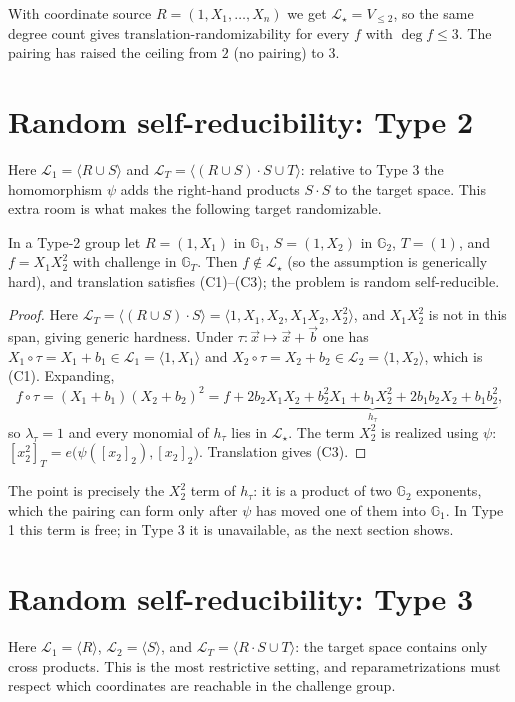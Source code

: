\documentclass{conjura-solution}
\newcommand{\Gone}{\mathbb{G}_1}
\newcommand{\Gtwo}{\mathbb{G}_2}
\newcommand{\GT}{\mathbb{G}_T}
\newcommand{\vx}{\vec{x}}
\newcommand{\vb}{\vec{b}}
\newcommand{\LL}{\mathcal{L}}
\newcommand{\Span}[1]{\langle #1 \rangle} %
\begin{document}
With coordinate source $R=(1,X_1,\dots,X_n)$ we get $\LL_\star=V_{\le 2}$, so the same
degree count gives translation-randomizability for every $f$ with $\deg f\le 3$. The
pairing has raised the ceiling from $2$ (no pairing) to $3$.

\section{Random self-reducibility: Type 2}

Here $\LL_1=\Span{R\cup S}$ and $\LL_T=\Span{(R\cup S)\cdot S\cup T}$: relative to Type 3
the homomorphism $\psi$ adds the right-hand products $S\cdot S$ to the target space. This
extra room is what makes the following target randomizable.

\begin{proposition}
\label{prop:type2}
In a Type-2 group let $R=(1,X_1)$ in $\Gone$, $S=(1,X_2)$ in $\Gtwo$, $T=(1)$, and
$f=X_1X_2^{2}$ with challenge in $\GT$. Then $f\notin\LL_\star$ (so the assumption is
generically hard), and translation satisfies \textup{(C1)--(C3)}; the problem is random
self-reducible.
\end{proposition}
\begin{proof}
Here $\LL_T=\Span{(R\cup S)\cdot S}=\Span{1,X_1,X_2,X_1X_2,X_2^{2}}$, and $X_1X_2^{2}$ is
not in this span, giving generic hardness. Under $\tau\colon\vx\mapsto\vx+\vb$ one has
$X_1\circ\tau=X_1+b_1\in\LL_1=\Span{1,X_1}$ and $X_2\circ\tau=X_2+b_2\in\LL_2=\Span{1,X_2}$,
which is (C1). Expanding,
\[
  f\circ\tau=(X_1+b_1)(X_2+b_2)^{2}
  =f+\underbrace{2b_2X_1X_2+b_2^{2}X_1+b_1X_2^{2}+2b_1b_2X_2+b_1b_2^{2}}_{h_\tau},
\]
so $\lambda_\tau=1$ and every monomial of $h_\tau$ lies in $\LL_\star$. The term $X_2^{2}$
is realized using $\psi$: $[x_2^{2}]_T=e\bigl(\psi([x_2]_2),[x_2]_2\bigr)$. Translation gives
(C3).
\end{proof}

The point is precisely the $X_2^{2}$ term of $h_\tau$: it is a product of two $\Gtwo$
exponents, which the pairing can form only after $\psi$ has moved one of them into $\Gone$.
In Type 1 this term is free; in Type 3 it is unavailable, as the next section shows.

\section{Random self-reducibility: Type 3}
\label{sec:type3}

Here $\LL_1=\Span{R}$, $\LL_2=\Span{S}$, and $\LL_T=\Span{R\cdot S\cup T}$: the target space
contains only cross products. This is the most restrictive setting, and reparametrizations
must respect which coordinates are reachable in the challenge group.
\end{document}
